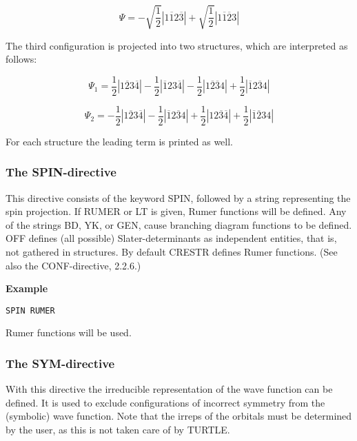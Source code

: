 \documentclass[11pt,fleqn]{article}
\begin{document}
\begin{equation}
\Psi = - \sqrt{\frac{1}{2}} |1\overline{1}2\overline{3}| + \sqrt{\frac{1}{2}} |1\overline{1}\overline{2}3| 
\end{equation}

The third configuration is projected into two structures, which are interpreted 
as follows:

\begin{equation}
\Psi_{1} = \frac{1}{2} |1\overline{2}3\overline{4}| -  
           \frac{1}{2} |\overline{1}23\overline{4}| -  
           \frac{1}{2} |1\overline{2}\overline{3}4| +  
           \frac{1}{2} |\overline{1}2\overline{3}4|   
\end{equation}

\begin{equation}
\Psi_{2} = -\frac{1}{2} |1\overline{2}3\overline{4}| -  
           \frac{1}{2} |\overline{1}2\overline{3}4| +  
           \frac{1}{2} |12\overline{3}\overline{4}| +  
           \frac{1}{2} |\overline{1}\overline{2}34|   
\end{equation}

For each structure the leading term is printed as well.

\subsubsection{The SPIN-directive}

This directive consists of the keyword SPIN, followed by a string representing 
the spin projection. If RUMER or LT is given, Rumer functions will be defined. 
Any of the strings BD, YK, or GEN, cause branching diagram functions to be defined. 
OFF defines (all possible) Slater-determinants as independent entities, that is, 
not gathered in structures. By default CRESTR defines Rumer functions. 
(See also the CONF-directive, 2.2.6.)

{\bf Example  }
\begin{verbatim} 
SPIN RUMER
\end{verbatim}

Rumer functions will be used.

\subsubsection{The SYM-directive}

With this directive the irreducible representation of the wave function can be defined. 
It is used to exclude configurations of incorrect symmetry from the (symbolic) wave 
function. Note that the irreps of the orbitals must be determined by the user,
as this is not taken care of by TURTLE.
\end{document}

